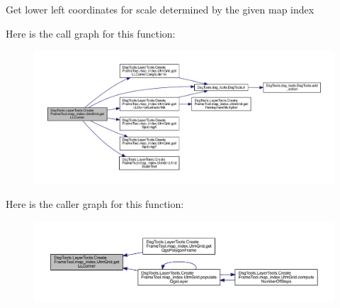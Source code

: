 \begin{DoxyVerb}Get lower left coordinates for scale determined by the given map index
\end{DoxyVerb}
 Here is the call graph for this function\+:
\nopagebreak
\begin{figure}[H]
\begin{center}
\leavevmode
\includegraphics[width=350pt]{class_dsg_tools_1_1_layer_tools_1_1_create_frame_tool_1_1map__index_1_1_utm_grid_a90dcecfe55cce7c83d38fbf95c05af0b_cgraph}
\end{center}
\end{figure}
Here is the caller graph for this function\+:
\nopagebreak
\begin{figure}[H]
\begin{center}
\leavevmode
\includegraphics[width=350pt]{class_dsg_tools_1_1_layer_tools_1_1_create_frame_tool_1_1map__index_1_1_utm_grid_a90dcecfe55cce7c83d38fbf95c05af0b_icgraph}
\end{center}
\end{figure}
\mbox{\label{class_dsg_tools_1_1_layer_tools_1_1_create_frame_tool_1_1map__index_1_1_utm_grid_aecd1f1dd22ac5ca3ceb9b2ae70d94130}} 
